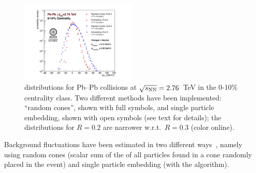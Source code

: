 \documentclass[a4paper]{jpconf}
\begin{document}
\begin{figure}[t]
\includegraphics[width=0.5\textwidth]{DeltaPtFullV2}\hspace{2pc}
\begin{minipage}[b]{14pc}\caption{\dpT{} distributions for \mbox{Pb--Pb} collisions at $\sqrt{s_{\rm NN}}=2.76$~TeV in the 0-10\% centrality class. 
Two different methods have been implemented: ``random cones'', shown with full symbols, and 
single particle embedding, shown with open symbols (see text for details);
 the distributions for $R=0.2$ are narrower w.r.t.~$R=0.3$ (color online).}
\label{fig:DeltaPtFullV2}
\end{minipage}
\end{figure}

Background fluctuations have been estimated in two different ways~\cite{bkg-alice-12}, namely using random cones
(scalar sum of the \pT{} of all particles found in a cone randomly placed in the event) and 
single particle embedding (with the \antikt{} algorithm).

\end{document}
